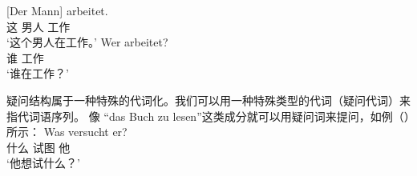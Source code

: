 \eal
\ex 
\gll {}[Der Mann] arbeitet.\\
	 \spacebr{}这 男人 工作\\
\glt `这个男人在工作。'
\ex 
\gll Wer arbeitet?\\
	 谁 工作\\
\glt `谁在工作？'
\zl

\noindent
疑问结构属于一种特殊的代词化。我们可以用一种特殊类型的代词（疑问代词）来指代词语序列。
像 “das Buch zu lesen”这类成分就可以用疑问词来提问，如例（）所示：
\ea
\gll Was versucht er?\\
     什么 试图 他\\
\glt `他想试什么？'
\z


